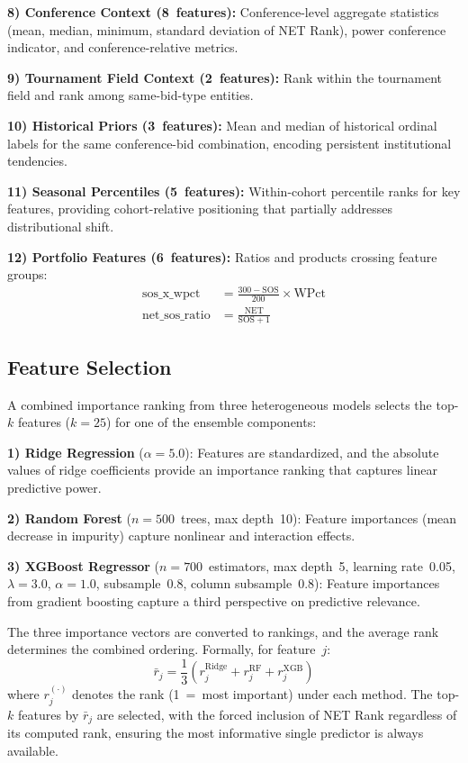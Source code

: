 \documentclass[conference]{IEEEtran}
\begin{document}
\textbf{8) Conference Context (8~features):} Conference-level aggregate statistics (mean, median, minimum, standard deviation of NET Rank), power conference indicator, and conference-relative metrics.

\textbf{9) Tournament Field Context (2~features):} Rank within the tournament field and rank among same-bid-type entities.

\textbf{10) Historical Priors (3~features):} Mean and median of historical ordinal labels for the same conference-bid combination, encoding persistent institutional tendencies.

\textbf{11) Seasonal Percentiles (5~features):} Within-cohort percentile ranks for key features, providing cohort-relative positioning that partially addresses distributional shift.

\textbf{12) Portfolio Features (6~features):} Ratios and products crossing feature groups:
\begin{align}
\text{sos\_x\_wpct} &= \frac{300 - \text{SOS}}{200} \times \text{WPct} \label{eq:sos_wpct}\\
\text{net\_sos\_ratio} &= \frac{\text{NET}}{\text{SOS} + 1} \label{eq:net_sos_ratio}
\end{align}

\subsection{Feature Selection}

A combined importance ranking from three heterogeneous models selects the top-$k$ features ($k = 25$) for one of the ensemble components:

\textbf{1) Ridge Regression} ($\alpha = 5.0$): Features are standardized, and the absolute values of ridge coefficients provide an importance ranking that captures linear predictive power.

\textbf{2) Random Forest} ($n = 500$~trees, max depth~10): Feature importances (mean decrease in impurity) capture nonlinear and interaction effects.

\textbf{3) XGBoost Regressor} ($n = 700$~estimators, max depth~5, learning rate~0.05, $\lambda = 3.0$, $\alpha = 1.0$, subsample~0.8, column subsample~0.8): Feature importances from gradient boosting capture a third perspective on predictive relevance.

The three importance vectors are converted to rankings, and the average rank determines the combined ordering. Formally, for feature~$j$:
\begin{equation}
\bar{r}_j = \frac{1}{3}\!\left(r_j^{\text{Ridge}} + r_j^{\text{RF}} + r_j^{\text{XGB}}\right)
\label{eq:avg_rank}
\end{equation}
where $r_j^{(\cdot)}$ denotes the rank (1~=~most important) under each method. The top-$k$ features by $\bar{r}_j$ are selected, with the forced inclusion of NET Rank regardless of its computed rank, ensuring the most informative single predictor is always available.
\end{document}
